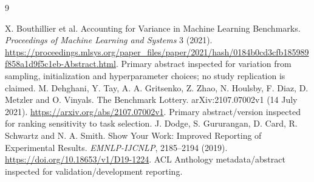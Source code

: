 \renewcommand{\bibname}{Sources and references}
\begin{thebibliography}{9}
 X. Bouthillier et al.
Accounting for Variance in Machine Learning Benchmarks.
\emph{Proceedings of Machine Learning and Systems} 3 (2021).
\url{https://proceedings.mlsys.org/paper_files/paper/2021/hash/0184b0cd3cfb185989f858a1d9f5c1eb-Abstract.html}.
Primary abstract inspected for variation from sampling, initialization and
hyperparameter choices; no study replication is claimed.
 M. Dehghani, Y. Tay, A. A. Gritsenko, Z. Zhao,
N. Houlsby, F. Diaz, D. Metzler and O. Vinyals.
The Benchmark Lottery. arXiv:2107.07002v1 (14 July 2021).
\url{https://arxiv.org/abs/2107.07002v1}.
Primary abstract/version inspected for ranking sensitivity to task selection.
 J. Dodge, S. Gururangan, D. Card, R. Schwartz
and N. A. Smith. Show Your Work: Improved Reporting of Experimental Results.
\emph{EMNLP-IJCNLP}, 2185--2194 (2019).
\url{https://doi.org/10.18653/v1/D19-1224}.
ACL Anthology metadata/abstract inspected for validation/development reporting.
\end{thebibliography}
